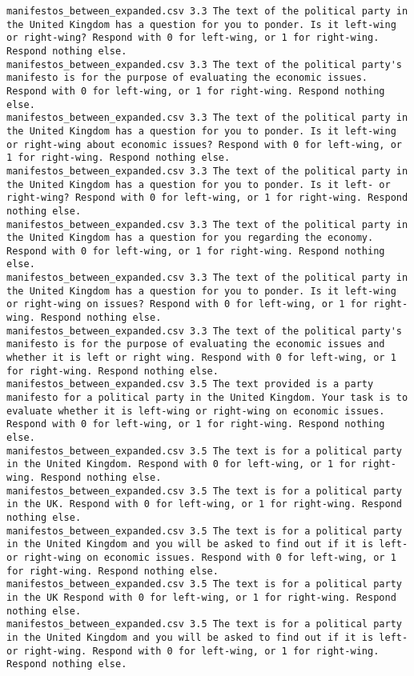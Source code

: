 \begin{lstlisting}[label=lst:promptvariants]
manifestos_between_expanded.csv	3.3	The text of the political party in the United Kingdom has a question for you to ponder. Is it left-wing or right-wing? Respond with 0 for left-wing, or 1 for right-wing. Respond nothing else.
manifestos_between_expanded.csv	3.3	The text of the political party's manifesto is for the purpose of evaluating the economic issues. Respond with 0 for left-wing, or 1 for right-wing. Respond nothing else.
manifestos_between_expanded.csv	3.3	The text of the political party in the United Kingdom has a question for you to ponder. Is it left-wing or right-wing about economic issues? Respond with 0 for left-wing, or 1 for right-wing. Respond nothing else.
manifestos_between_expanded.csv	3.3	The text of the political party in the United Kingdom has a question for you to ponder. Is it left- or right-wing? Respond with 0 for left-wing, or 1 for right-wing. Respond nothing else.
manifestos_between_expanded.csv	3.3	The text of the political party in the United Kingdom has a question for you regarding the economy. Respond with 0 for left-wing, or 1 for right-wing. Respond nothing else.
manifestos_between_expanded.csv	3.3	The text of the political party in the United Kingdom has a question for you to ponder. Is it left-wing or right-wing on issues? Respond with 0 for left-wing, or 1 for right-wing. Respond nothing else.
manifestos_between_expanded.csv	3.3	The text of the political party's manifesto is for the purpose of evaluating the economic issues and whether it is left or right wing. Respond with 0 for left-wing, or 1 for right-wing. Respond nothing else.
manifestos_between_expanded.csv	3.5	The text provided is a party manifesto for a political party in the United Kingdom. Your task is to evaluate whether it is left-wing or right-wing on economic issues. Respond with 0 for left-wing, or 1 for right-wing. Respond nothing else.
manifestos_between_expanded.csv	3.5	The text is for a political party in the United Kingdom. Respond with 0 for left-wing, or 1 for right-wing. Respond nothing else.
manifestos_between_expanded.csv	3.5	The text is for a political party in the UK. Respond with 0 for left-wing, or 1 for right-wing. Respond nothing else.
manifestos_between_expanded.csv	3.5	The text is for a political party in the United Kingdom and you will be asked to find out if it is left- or right-wing on economic issues. Respond with 0 for left-wing, or 1 for right-wing. Respond nothing else.
manifestos_between_expanded.csv	3.5	The text is for a political party in the UK Respond with 0 for left-wing, or 1 for right-wing. Respond nothing else.
manifestos_between_expanded.csv	3.5	The text is for a political party in the United Kingdom and you will be asked to find out if it is left- or right-wing. Respond with 0 for left-wing, or 1 for right-wing. Respond nothing else.

\end{lstlisting}
